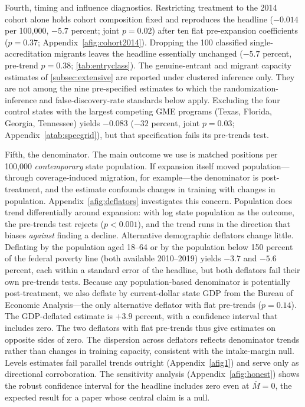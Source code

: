 Fourth, timing and influence diagnostics. Restricting treatment to the 2014 cohort alone holds cohort composition fixed and reproduces the headline ($-0.014$ per 100{,}000, $-5.7$ percent; joint $p = 0.02$) after ten flat pre-expansion coefficients ($p = 0.37$; Appendix~\cref{afig:cohort2014}). Dropping the 100 classified single-accreditation migrants leaves the headline essentially unchanged ($-5.7$ percent, pre-trend $p = 0.38$; \cref{tab:entryclass}). The genuine-entrant and migrant capacity estimates of \cref{subsec:extensive} are reported under clustered inference only. They are not among the nine pre-specified estimates to which the randomization-inference and false-discovery-rate standards below apply. Excluding the four control states with the largest competing GME programs (Texas, Florida, Georgia, Tennessee) yields $-0.083$ ($-32$ percent, joint $p = 0.03$; Appendix~\cref{atab:specgrid}), but that specification fails its pre-trends test.

Fifth, the denominator. The main outcome we use is matched positions per 100{,}000 \emph{contemporary} state population. If expansion itself moved population---through coverage-induced migration, for example---the denominator is post-treatment, and the estimate confounds changes in training with changes in population. Appendix~\cref{afig:deflators} investigates this concern. Population does trend differentially around expansion: with log state population as the outcome, the pre-trends test rejects ($p < 0.001$), and the trend runs in the direction that biases \emph{against} finding a decline. Alternative demographic deflators change little. Deflating by the population aged 18--64 or by the population below 150 percent of the federal poverty line (both available 2010--2019) yields $-3.7$ and $-5.6$ percent, each within a standard error of the headline, but both deflators fail their own pre-trends tests. Because any population-based denominator is potentially post-treatment, we also deflate by current-dollar state GDP from the Bureau of Economic Analysis---the only alternative deflator with flat pre-trends ($p = 0.14$). The GDP-deflated estimate is $+3.9$ percent, with a confidence interval that includes zero. The two deflators with flat pre-trends thus give estimates on opposite sides of zero. The dispersion across deflators reflects denominator trends rather than changes in training capacity, consistent with the intake-margin null. Levels estimates fail parallel trends outright (Appendix~\cref{afig1}) and serve only as directional corroboration. The \textcite{rambachan2023more} sensitivity analysis (Appendix~\cref{afig:honest}) shows the robust confidence interval for the headline includes zero even at $\bar{M} = 0$, the expected result for a paper whose central claim is a null.

